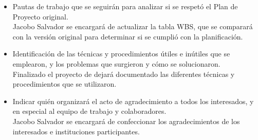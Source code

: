 \documentclass[
11pt, %
codirector, %
]{charter}
\begin{document}
\begin{itemize}
\item Pautas de trabajo que se seguirán para analizar si se respetó el Plan de Proyecto original.\\
Jacobo Salvador se encargará de actualizar la tabla WBS, que se comparará con la versión original para determinar si se cumplió con la planificación.

\item Identificación de las técnicas y procedimientos útiles e inútiles que se emplearon, y los problemas que surgieron y cómo se solucionaron.\\
 Finalizado el proyecto de dejará documentado las diferentes técnicas y procedimientos que se utilizaron.

\item Indicar quién organizará el acto de agradecimiento a todos los interesados, y en especial al equipo de trabajo y colaboradores.\\
 Jacobo Salvador se encargará de confeccionar los agradecimientos de los interesados e instituciones participantes.


\end{itemize}
\end{document}
